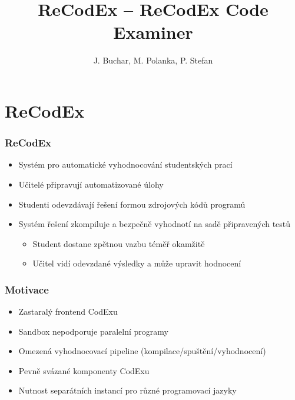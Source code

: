 \documentclass{beamer}
\begin{document}

\title[ReCodEx -- ReCodEx Code Examiner] %
{ReCodEx -- ReCodEx Code Examiner}
\author[Buchar, Polanka, Stefan]{J. Buchar, M. Polanka, P. Stefan}
\date[3. 12. 2016]{} %
\subject{Computer Science}

\frame{\titlepage}

\section{ReCodEx}

\begin{frame}
	\frametitle{ReCodEx}
	\begin{itemize}
		\item Systém pro automatické vyhodnocování studentských prací
		\item Učitelé připravují automatizované úlohy
		\item Studenti odevzdávají řešení formou zdrojových kódů programů
		\item Systém řešení zkompiluje a bezpečně vyhodnotí na sadě připravených testů
		\begin{itemize}
			\item Student dostane zpětnou vazbu téměř okamžitě
			\item Učitel vidí odevzdané výsledky a může upravit hodnocení
		\end{itemize}
	\end{itemize}
\end{frame}

\begin{frame}
	\frametitle{Motivace}
	\begin{itemize}
		\item Zastaralý frontend CodExu
		\item Sandbox nepodporuje paralelní programy
		\item Omezená vyhodnocovací pipeline (kompilace/spuštění/vyhodnocení)
		\item Pevně svázané komponenty CodExu
		\item Nutnost separátních instancí pro různé programovací jazyky
	\end{itemize}
\end{frame}
\end{document}
